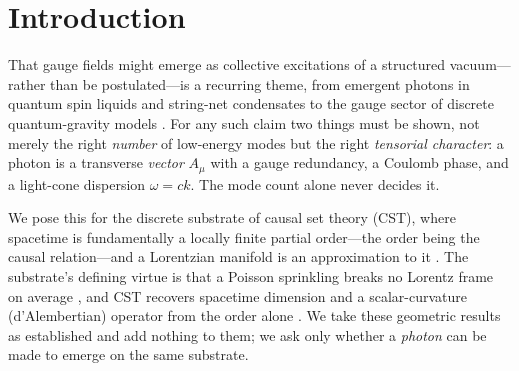 \documentclass[aps,prd,reprint,nofootinbib,superscriptaddress,floatfix]{revtex4-2}
\begin{document}
\maketitle

\section{Introduction}\label{sec:intro}

That gauge fields might emerge as collective excitations of a structured vacuum---rather
than be postulated---is a recurring theme, from emergent photons in quantum spin liquids
and string-net condensates to the gauge sector of discrete quantum-gravity models
\cite{SverdlovBombelli2009}. For any such claim two things must be shown, not merely the
right \emph{number} of low-energy modes but the right \emph{tensorial character}: a
photon is a transverse \emph{vector} $A_\mu$ with a gauge redundancy, a Coulomb phase,
and a light-cone dispersion $\omega=ck$. The mode count alone never decides it.

We pose this for the discrete substrate of causal set theory (CST), where spacetime is
fundamentally a locally finite partial order---the order being the causal relation---and
a Lorentzian manifold is an approximation to it \cite{BLMS1987}. The substrate's
defining virtue is that a Poisson sprinkling breaks no Lorentz frame on average
\cite{BombelliHensonSorkin2009}, and CST recovers spacetime dimension and a
scalar-curvature (d'Alembertian) operator from the order alone
\cite{Myrheim1978,BenincasaDowker2010,Surya2019}. We take these geometric results as
established and add nothing to them; we ask only whether a \emph{photon} can be made to
emerge on the same substrate.
\end{document}
